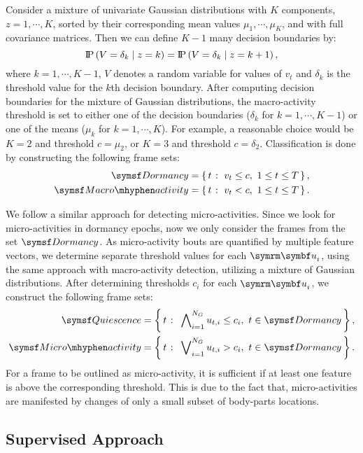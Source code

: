 Consider a mixture of univariate Gaussian distributions with $K$ components, $z=1, \cdots, K$, sorted by their corresponding mean values $\mu_1, \cdots, \mu_K$, and with full covariance matrices. Then we can define $K-1$ many decision boundaries by:
\begin{equation}
	\operatorname{\text{I\kern-0.15em P}} \left( V=\delta_k \;\middle|\; z=k \right) = \operatorname{\text{I\kern-0.15em P}} \left( V=\delta_k \;\middle|\; z=k+1 \right),
\end{equation}
where $k=1, \cdots, K-1$, $V$ denotes a random variable for values of $v_t$ and $\delta_k$ is the threshold value for the $k$th decision boundary.
After computing decision boundaries for the mixture of Gaussian distributions, the macro-activity threshold is set to either one of the decision boundaries ($\delta_k$ for $k=1, \cdots, K-1$) or one of the means ($\mu_k$ for $k=1, \cdots, K$).
For example, a reasonable choice would be $K=2$ and threshold $c=\mu_2$, or $K=3$ and threshold $c=\delta_2$.
Classification is done by constructing the following frame sets:
\begin{equation}
	\begin{aligned}
		\Dormancy      & =\Set{t}{v_t \leq c, \ 1\leq t \leq T}, \\
		\MacroActivity & =\Set{t}{v_t<c, \ 1\leq t \leq T}.
	\end{aligned}
\end{equation}

We follow a similar approach for detecting micro-activities.
Since we look for micro-activities in dormancy epochs, now we only consider the frames from the set $\Dormancy$.
As micro-activity bouts are quantified by multiple feature vectors, we determine separate threshold values for each $\V{u}_i$, using the same approach with macro-activity detection, utilizing a mixture of Gaussian distributions.
After determining thresholds $c_i$ for each $\V{u}_i$, we construct the following frame sets:
\begin{equation}
	\begin{aligned}
		\Quiescence    & = \Set{t}{\bigwedge\nolimits_{i=1}^{N_G} u_{t,i} \leq c_i, \ t \in \Dormancy}, \\
		\MicroActivity & = \Set{t}{\bigvee\nolimits_{i=1}^{N_G} u_{t,i} > c_i, \ t \in \Dormancy}.
	\end{aligned}
\end{equation}
For a frame to be outlined as micro-activity, it is sufficient if at least one feature is above the corresponding threshold.
This is due to the fact that, micro-activities are manifested by changes of only a small subset of body-parts locations.

\subsection{Supervised Approach}
